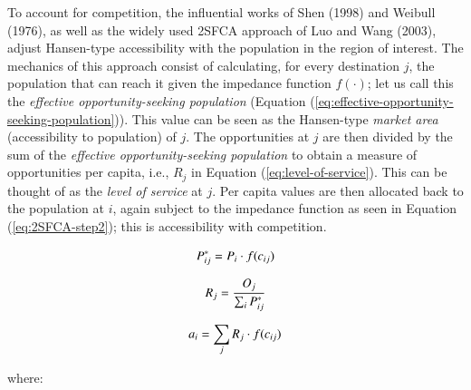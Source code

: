 \documentclass[]{elsarticle} %
\begin{document}
To account for competition, the influential works of Shen (1998) and
Weibull (1976), as well as the widely used 2SFCA approach of Luo and
Wang (2003), adjust Hansen-type accessibility with the population in the
region of interest. The mechanics of this approach consist of
calculating, for every destination \(j\), the population that can reach
it given the impedance function \(f(\cdot)\); let us call this the
\emph{effective opportunity-seeking population} (Equation
(\ref{eq:effective-opportunity-seeking-population})). This value can be
seen as the Hansen-type \emph{market area} (accessibility to population)
of \(j\). The opportunities at \(j\) are then divided by the sum of the
\emph{effective opportunity-seeking population} to obtain a measure of
opportunities per capita, i.e., \(R_j\) in Equation
(\ref{eq:level-of-service}). This can be thought of as the \emph{level
of service} at \(j\). Per capita values are then allocated back to the
population at \(i\), again subject to the impedance function as seen in
Equation (\ref{eq:2SFCA-step2}); this is accessibility with competition.

\begin{equation}
\label{eq:effective-opportunity-seeking-population}
P_{ij}^* = P_{i} \cdot f(c_{ij})\\
\end{equation}

\begin{equation}
\label{eq:level-of-service}
R_{j} = \frac{O_{j}}{\sum_i P_{ij}^*}\\
\end{equation}

\begin{equation}
\label{eq:2SFCA-step2}
a_{i} = {\sum_j R_{j} \cdot f(c_{ij})}\\
\end{equation}

\noindent where:
\end{document}
